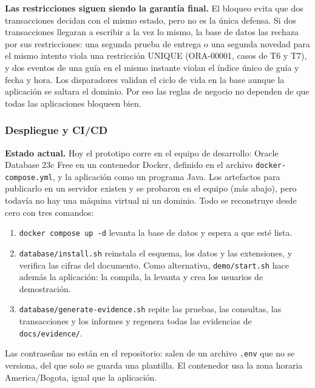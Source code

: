 \textbf{Las restricciones siguen siendo la garantía final.} El bloqueo
evita que dos transacciones decidan con el mismo estado, pero no es la
única defensa. Si dos transacciones llegaran a escribir a la vez lo mismo,
la base de datos las rechaza por sus restricciones: una segunda prueba de
entrega o una segunda novedad para el mismo intento viola una restricción
UNIQUE (ORA-00001, casos de T6 y T7), y dos eventos de una guía en el mismo
instante violan el índice único de guía y fecha y hora. Los disparadores
validan el ciclo de vida en la base aunque la aplicación se saltara el
dominio. Por eso las reglas de negocio no dependen de que todas las
aplicaciones bloqueen bien.


\subsubsection{Despliegue y CI/CD}
\label{sec:proto-despliegue}

\textbf{Estado actual.} Hoy el prototipo corre en el equipo de desarrollo:
Oracle Database 23c Free en un contenedor Docker, definido en el archivo
\texttt{docker-compose.yml}, y la aplicación como un programa Java. Los
artefactos para publicarlo en un servidor existen y se probaron en el equipo
(más abajo), pero todavía no hay una máquina virtual ni un dominio. Todo se
reconstruye desde cero con tres comandos:

\begin{enumerate}[itemsep=2pt]
  \item \texttt{docker compose up -d} levanta la base de datos y espera a que
        esté lista.
  \item \texttt{database/install.sh} reinstala el esquema, los datos y las
        extensiones, y verifica las cifras del documento. Como alternativa,
        \texttt{demo/start.sh} hace además la aplicación: la
        compila, la levanta y crea los usuarios de demostración.
  \item \texttt{database/generate-evidence.sh} repite las pruebas, las consultas, las
        transacciones y los informes y regenera todas las evidencias de
        \texttt{docs/evidence/}.
\end{enumerate}

Las contraseñas no están en el repositorio: salen de un archivo \texttt{.env}
que no se versiona, del que solo se guarda una plantilla. El
contenedor usa la zona horaria America/Bogota, igual que la aplicación.


